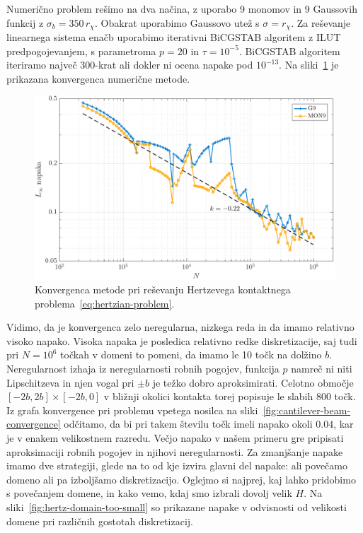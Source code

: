 \documentclass[12pt,a4paper,twoside]{article}
\theoremstyle{definition} %
\theoremstyle{plain} %
\numberwithin{equation}{section}
\newlength{\iw}
\begin{document}
Numerično problem rešimo na dva načina, z uporabo 9 monomov in 9 Gaussovih funkcij z $\sigma_b =
350\,r_\chi$. Obakrat uporabimo Gaussovo utež s $\sigma = r_\chi$. Za reševanje linearnega
sistema enačb uporabimo iterativni BiCGSTAB algoritem z ILUT predpogojevanjem, s parametroma $p=20$
in $\tau = 10^{-5}$. BiCGSTAB algoritem iteriramo največ 300-krat ali dokler ni ocena
napake pod $10^{-13}$. Na sliki~\ref{fig:hertz-convergence} je prikazana konvergenca numerične
metode.

\begin{figure}[!h]
  \centering
  \includegraphics[width=\iw]{images/hertzian_convergence.pdf}
  \caption[Konvergenca metode pri reševanju kontaktnega problema.]{Konvergenca metode pri reševanju
  Hertzevega kontaktnega problema~\eqref{eq:hertzian-problem}.}
  \label{fig:hertz-convergence}
\end{figure}

Vidimo, da je konvergenca zelo neregularna, nizkega reda in da imamo relativno visoko napako.
Visoka napaka je posledica relativno redke diskretizacije, saj tudi pri $N = 10^6$ točkah v domeni
to pomeni, da imamo le 10 točk na dolžino $b$. Neregularnost izhaja iz neregularnosti robnih
pogojev, funkcija $p$ namreč ni niti Lipschitzeva in njen vogal pri $\pm b$ je težko dobro
aproksimirati. Celotno območje $[-2b, 2b] \times [-2b, 0]$ v bližnji okolici kontakta torej popisuje
le slabih 800 točk. Iz grafa konvergence pri problemu vpetega nosilca na
sliki~\ref{fig:cantilever-beam-convergence} odčitamo, da bi pri takem številu točk imeli napako
okoli $0.04$, kar je v enakem velikostnem razredu. Večjo napako v našem primeru gre pripisati
aproksimaciji robnih pogojev in njihovi neregularnosti. Za zmanjšanje napake imamo dve strategiji,
glede na to od kje izvira glavni del napake: ali povečamo domeno ali pa izboljšamo diskretizacijo.
Oglejmo si najprej, kaj lahko pridobimo s povečanjem domene, in kako vemo, kdaj smo izbrali dovolj
velik $H$. Na sliki~\ref{fig:hertz-domain-too-small} so prikazane napake v odvisnosti od velikosti
domene pri različnih gostotah diskretizacij.
\end{document}
